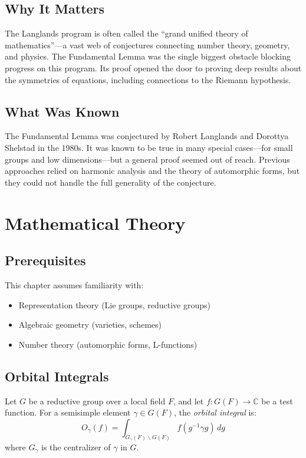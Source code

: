 \subsection{Why It Matters}
The Langlands program is often called the ``grand unified theory of mathematics''---a vast web of conjectures connecting number theory, geometry, and physics. The Fundamental Lemma was the single biggest obstacle blocking progress on this program. Its proof opened the door to proving deep results about the symmetries of equations, including connections to the Riemann hypothesis.

\subsection{What Was Known}
The Fundamental Lemma was conjectured by Robert Langlands and Dorottya Shelstad in the 1980s. It was known to be true in many special cases---for small groups and low dimensions---but a general proof seemed out of reach. Previous approaches relied on harmonic analysis and the theory of automorphic forms, but they could not handle the full generality of the conjecture.

\section{Mathematical Theory}


\subsection{Prerequisites}
This chapter assumes familiarity with:
\begin{itemize}
\item Representation theory (Lie groups, reductive groups)
\item Algebraic geometry (varieties, schemes)
\item Number theory (automorphic forms, L-functions)
\end{itemize}

\subsection{Orbital Integrals}

\begin{definition}
Let $G$ be a reductive group over a local field $F$, and let $f: G(F) \to \mathbb{C}$ be a test function. For a semisimple element $\gamma \in G(F)$, the \emph{orbital integral} is:
\begin{equation}
O_\gamma(f) = \int_{G_\gamma(F) \backslash G(F)} f(g^{-1}\gamma g) \, dg
\end{equation}
where $G_\gamma$ is the centralizer of $\gamma$ in $G$.
\end{definition}

